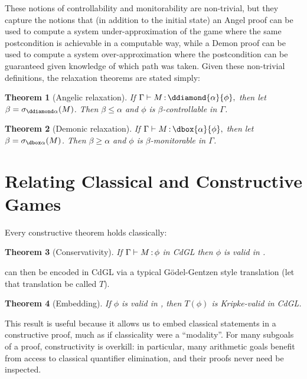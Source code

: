 \documentclass[12pt]{cmuthesis}
\newtheorem{theorem}{Theorem}
\theoremstyle{definition}
\theoremstyle{remark}
\newcommand{\CdGL}{\textsf{CdGL}\xspace}
\begin{document}
These notions of controllability and monitorability are non-trivial, but they capture the notions that (in addition to the initial state) an Angel proof can be used to compute a system under-approximation of the game where the same postcondition is achievable in a computable way, while a Demon proof can be used to compute a system over-approximation where the postcondition can be guaranteed given knowledge of which path was taken.
Given these non-trivial definitions, the relaxation theorems are stated simply:
\begin{theorem}[Angelic relaxation]
  If $\proves{\Gamma}{M}{\ddiamond{\alpha}{\phi}},$ then let $\beta = \ainline{\alpha}{M}$.
  Then $\beta \leq \alpha$ and $\phi$ is $\beta$-controllable in $\Gamma$.
\end{theorem}
\begin{theorem}[Demonic relaxation]
  If $\proves{\Gamma}{M}{\dbox{\alpha}{\phi}},$ then let $\beta = \dinline{\alpha}{M}$.
  Then $\beta \geq \alpha$ and $\phi$ is $\beta$-monitorable in $\Gamma$.
\end{theorem}


\section{Relating Classical and Constructive Games}
Every constructive theorem holds classically:
\begin{theorem}[Conservativity]
If $\Gamma \vdash M\mathop{:}\phi$ in \CdGL then $\phi$ is valid in \dGL.
\end{theorem}

\dGL can then be encoded in \CdGL via a typical G\"{o}del-Gentzen style translation (let that translation be called $T$).
\begin{theorem}[\dGL Embedding]
  If $\phi$ is valid in \dGL, then $T(\phi)$ is Kripke-valid in \CdGL.
\end{theorem}
This result is useful because it allows us to embed classical statements in a constructive proof, much as if classicality were a ``modality''.
For many subgoals of a proof, constructivity is overkill: in particular, many arithmetic goals benefit from access to classical quantifier elimination, and their proofs never need be inspected.
\end{document}
